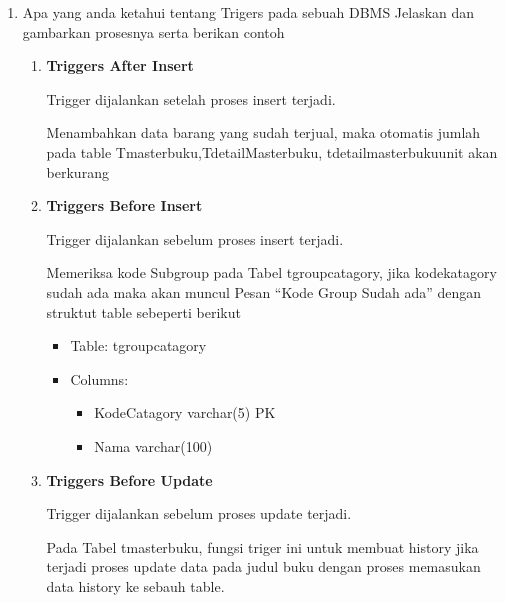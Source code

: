 \documentclass[12pt,a4paper]{article}
\begin{document}
\begin{enumerate}
      \newpage

      \item Apa yang anda ketahui tentang Trigers pada sebuah DBMS Jelaskan dan
        gambarkan prosesnya serta berikan contoh 

        \begin{enumerate}
          \item \textbf{Triggers After Insert}

            Trigger dijalankan setelah proses insert terjadi.

            Menambahkan data barang yang sudah terjual, maka otomatis jumlah
            pada table Tmasterbuku,TdetailMasterbuku, tdetailmasterbukuunit
            akan berkurang

            

          \item \textbf{Triggers Before Insert}

            Trigger dijalankan sebelum proses insert terjadi.

            Memeriksa kode Subgroup pada Tabel
            tgroupcatagory, jika kodekatagory sudah ada maka akan muncul Pesan “Kode
            Group Sudah ada” dengan struktut table sebeperti berikut

            \begin{itemize}
              \item Table: tgroupcatagory
              \item Columns:
                \begin{itemize}
                  \item KodeCatagory varchar(5) PK
                  \item Nama varchar(100)
                \end{itemize}
            \end{itemize}

            

          \item \textbf{Triggers Before Update}

            Trigger dijalankan sebelum proses update terjadi.

            Pada Tabel tmasterbuku, fungsi triger ini untuk membuat history jika
            terjadi proses update data pada judul buku dengan proses memasukan
            data history ke sebauh table.

            


\end{enumerate}
\end{enumerate}
\end{document}
